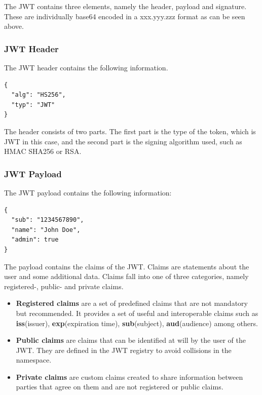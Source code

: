 The JWT contains three elements, namely the header, payload and signature. These are individually base64 encoded in a xxx.yyy.zzz format as can be seen above.

\subsubsection{JWT Header}

The JWT header contains the following information.

\begin{lstlisting}
{
  "alg": "HS256",
  "typ": "JWT"
}   
\end{lstlisting}

The header consists of two parts. The first part is the type of the token, which is JWT in this case, and the second part is the signing algorithm used, such as HMAC SHA256 or RSA.

\subsubsection{JWT Payload}

The JWT payload contains the following information:

\begin{lstlisting}
{
  "sub": "1234567890",
  "name": "John Doe",
  "admin": true
}
\end{lstlisting}

The payload contains the claims of the JWT. Claims are statements about the user and some additional data. Claims fall into one of three categories, namely registered-, public- and private claims.

\begin{itemize}
    \item \textbf{Registered claims} are a set of predefined claims that are not mandatory but recommended. It provides a set of useful and interoperable claims such as \textbf{iss}(issuer), \textbf{exp}(expiration time), \textbf{sub}(subject), \textbf{aud}(audience) among others.
    \item \textbf{Public claims} are claims that can be identified at will by the user of the JWT. They are defined in the JWT registry to avoid collisions in the namespace.
    \item \textbf{Private claims} are custom claims created to share information between parties that agree on them and are not registered or public claims.
\end{itemize}

